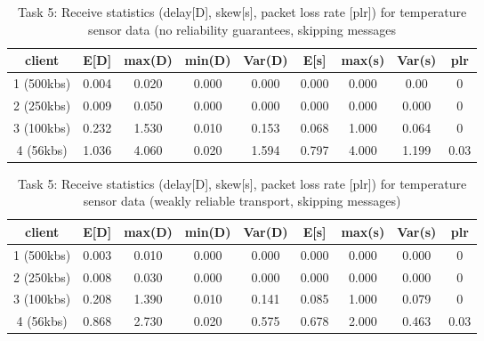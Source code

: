 \begin{table}
\centering
\begin{tabular}{|c|c|c|c|c|c|c|c|c|}
\hline
client & E[D] & max(D) & min(D) & Var(D) & E[s] & max(s) & Var(s) & plr\\
\hline
1 (500kbs) & 0.004 & 0.020 & 0.000 & 0.000 & 0.000 & 0.000 & 0.00 & 0 \\
\hline
2 (250kbs) & 0.009 & 0.050 & 0.000 & 0.000 & 0.000 & 0.000 & 0.000 & 0 \\
\hline
3 (100kbs) & 0.232 & 1.530 & 0.010 & 0.153 & 0.068 & 1.000 & 0.064 & 0  \\
\hline
4 (56kbs) & 1.036 & 4.060 & 0.020 & 1.594 & 0.797 & 4.000 & 1.199 & 0.03\\
\hline
\end{tabular}
\caption{Task 5: Receive statistics (delay[D], skew[s], packet loss rate [plr]) for temperature sensor data (no reliability guarantees, skipping messages}
\label{table:task5-tmp-c}
\end{table}

\begin{table}
\centering
\begin{tabular}{|c|c|c|c|c|c|c|c|c|}
\hline
client & E[D] & max(D) & min(D) & Var(D) & E[s] & max(s) & Var(s) & plr\\
\hline
1 (500kbs) & 0.003 & 0.010 & 0.000 & 0.000 & 0.000 & 0.000 & 0.000 & 0 \\
\hline
2 (250kbs) & 0.008 & 0.030 & 0.000 & 0.000 & 0.000 & 0.000 & 0.000 & 0 \\
\hline
3 (100kbs) & 0.208 & 1.390 & 0.010 & 0.141 & 0.085 & 1.000 & 0.079 & 0\\
\hline
4 (56kbs) & 0.868 & 2.730 & 0.020 & 0.575 & 0.678 & 2.000 &  0.463 & 0.03\\
\hline
\end{tabular}
\caption{Task 5: Receive statistics (delay[D], skew[s], packet loss rate [plr]) for temperature sensor data (weakly reliable transport, skipping messages)}
\label{table:task5-temp-e}
\end{table}

